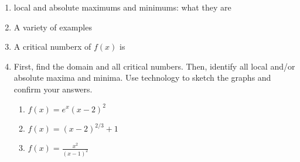 \documentclass[11pt,fleqn]{article}
\begin{document}
\setlength{\parindent}{0cm}
\renewcommand{\headrulewidth}{0pt}
\newcommand{\blank}[1]{\rule{#1}{0.75pt}}
\renewcommand{\d}{\displaystyle}
\vspace*{-0.7in}
\begin{center}
 {\large{ }}
\end{center}
 \begin{enumerate}
 \item local and absolute maximums and minimums: what they are
 \vfill
 \item A variety of examples
 \vfill
 
 \item A critical numberx of $f(x)$ is 
 \vspace{1in}
 \newpage
 \item First, find the domain and all critical numbers. Then, identify all local and/or absolute maxima and minima. Use technology to sketch the graphs and confirm your answers.
 \begin{enumerate}
 \item $f(x)=e^x(x-2)^2$
 \vfill
 \item $f(x)= (x-2)^{2/3}+1$
 \vfill
 \item $f(x)=\frac{x^2}{(x-1)^2}$
 \vfill
 \end{enumerate}
 \end{enumerate}
\end{document}
